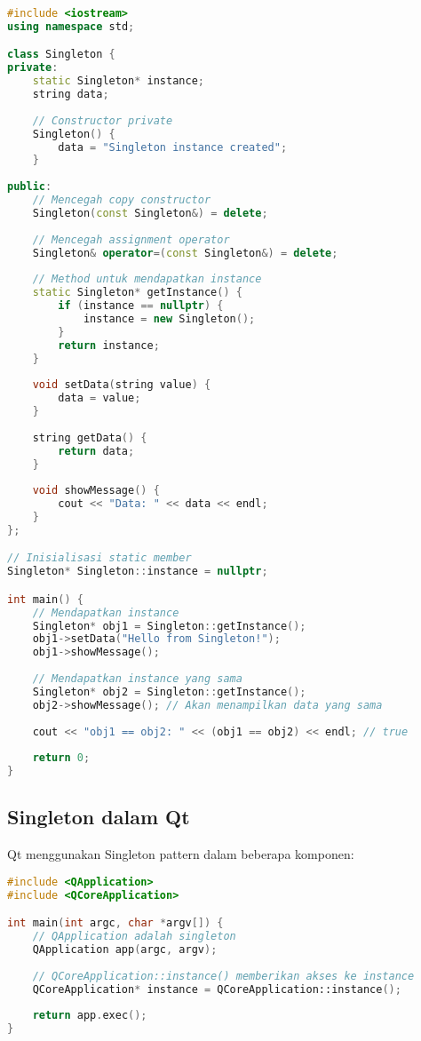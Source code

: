 \begin{lstlisting}[language=c++, caption=Singleton Pattern Implementation]
#include <iostream>
using namespace std;

class Singleton {
private:
    static Singleton* instance;
    string data;
    
    // Constructor private
    Singleton() {
        data = "Singleton instance created";
    }
    
public:
    // Mencegah copy constructor
    Singleton(const Singleton&) = delete;
    
    // Mencegah assignment operator
    Singleton& operator=(const Singleton&) = delete;
    
    // Method untuk mendapatkan instance
    static Singleton* getInstance() {
        if (instance == nullptr) {
            instance = new Singleton();
        }
        return instance;
    }
    
    void setData(string value) {
        data = value;
    }
    
    string getData() {
        return data;
    }
    
    void showMessage() {
        cout << "Data: " << data << endl;
    }
};

// Inisialisasi static member
Singleton* Singleton::instance = nullptr;

int main() {
    // Mendapatkan instance
    Singleton* obj1 = Singleton::getInstance();
    obj1->setData("Hello from Singleton!");
    obj1->showMessage();
    
    // Mendapatkan instance yang sama
    Singleton* obj2 = Singleton::getInstance();
    obj2->showMessage(); // Akan menampilkan data yang sama
    
    cout << "obj1 == obj2: " << (obj1 == obj2) << endl; // true
    
    return 0;
}
\end{lstlisting}

\subsection{Singleton dalam Qt}

Qt menggunakan Singleton pattern dalam beberapa komponen:

\begin{lstlisting}[language=c++, caption=Qt Singleton Example]
#include <QApplication>
#include <QCoreApplication>

int main(int argc, char *argv[]) {
    // QApplication adalah singleton
    QApplication app(argc, argv);
    
    // QCoreApplication::instance() memberikan akses ke instance
    QCoreApplication* instance = QCoreApplication::instance();
    
    return app.exec();
}
\end{lstlisting}

